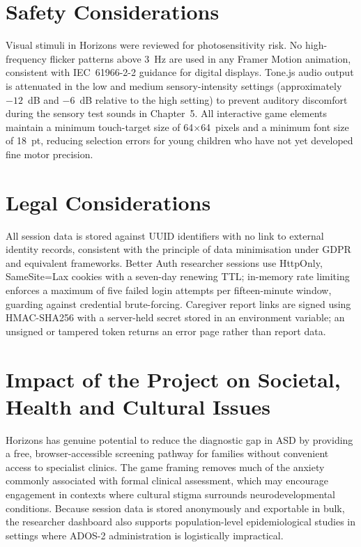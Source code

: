 \documentclass[12pt,a4paper,oneside]{report}
\begin{document}
	\section{Safety Considerations}
	
	Visual stimuli in Horizons were reviewed for photosensitivity risk. No high-frequency flicker patterns above 3~Hz are used in any Framer Motion animation, consistent with IEC~61966-2-2 guidance for digital displays. Tone.js audio output is attenuated in the low and medium sensory-intensity settings (approximately $-12$~dB and $-6$~dB relative to the high setting) to prevent auditory discomfort during the sensory test sounds in Chapter~5. All interactive game elements maintain a minimum touch-target size of 64$\times$64~pixels and a minimum font size of 18~pt, reducing selection errors for young children who have not yet developed fine motor precision.
	
	\section{Legal Considerations}
	
	All session data is stored against UUID identifiers with no link to external identity records, consistent with the principle of data minimisation under GDPR and equivalent frameworks. Better Auth researcher sessions use HttpOnly, SameSite=Lax cookies with a seven-day renewing TTL; in-memory rate limiting enforces a maximum of five failed login attempts per fifteen-minute window, guarding against credential brute-forcing. Caregiver report links are signed using HMAC-SHA256 with a server-held secret stored in an environment variable; an unsigned or tampered token returns an error page rather than report data.
	
	\section{Impact of the Project on Societal, Health and Cultural Issues}
	
	Horizons has genuine potential to reduce the diagnostic gap in ASD by providing a free, browser-accessible screening pathway for families without convenient access to specialist clinics. The game framing removes much of the anxiety commonly associated with formal clinical assessment, which may encourage engagement in contexts where cultural stigma surrounds neurodevelopmental conditions. Because session data is stored anonymously and exportable in bulk, the researcher dashboard also supports population-level epidemiological studies in settings where ADOS-2 administration is logistically impractical.
	
\end{document}

